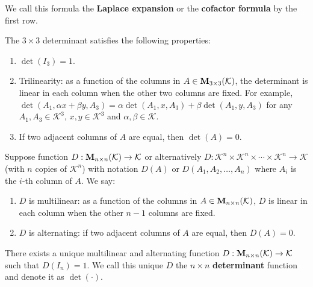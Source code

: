     \begin{remarkenv}
        We call this formula the \textbf{Laplace expansion} or the \textbf{cofactor formula} by the first row.
    \end{remarkenv}
    \begin{theoremenv}
        The $3\times 3$ determinant satisfies the following properties:
        \begin{enumerate}
            \item $\det(I_3) = 1$.
            \item Trilinearity: as a function of the columns in $A\in \mathbf{M}_{3 \times 3}(\mathcal{K})$, the determinant is linear in each column when the other two columns are fixed. For example, $\det(A_1, \alpha x + \beta y, A_3) = \alpha \det(A_1, x, A_3) + \beta \det(A_1, y, A_3)$ for any $A_1, A_3 \in \mathcal{K}^3$, $x,y \in \mathcal{K}^3$ and $\alpha, \beta \in \mathcal{K}$.
            \item If two adjacent columns of $A$ are equal, then $\det(A) = 0$.
        \end{enumerate}
    \end{theoremenv}
    \begin{definitionenv}
        Suppose function $D: \mathbf{M}_{n \times n}(\mathcal{K}) \to \mathcal{K}$ or alternatively $D: \mathcal{K}^n \times \mathcal{K}^n \times \cdots \times \mathcal{K}^n \to \mathcal{K}$ (with $n$ copies of $\mathcal{K}^n$) with notation $D(A)$ or $D(A_1, A_2, \ldots, A_n)$ where $A_i$ is the $i$-th column of $A$. We say:
        \begin{enumerate}
            \item $D$ is multilinear: as a function of the columns in $A\in \mathbf{M}_{n \times n}(\mathcal{K})$, $D$ is linear in each column when the other $n-1$ columns are fixed.
            \item $D$ is alternating: if two adjacent columns of $A$ are equal, then $D(A) = 0$.
        \end{enumerate}
    \end{definitionenv}
    \begin{theoremenv}
        There exists a unique multilinear and alternating function $D: \mathbf{M}_{n \times n}(\mathcal{K}) \to \mathcal{K}$ such that $D(I_n) = 1$. We call this unique $D$ the $n\times n$ \textbf{determinant} function and denote it as $\det(\cdot)$.
    \end{theoremenv}
